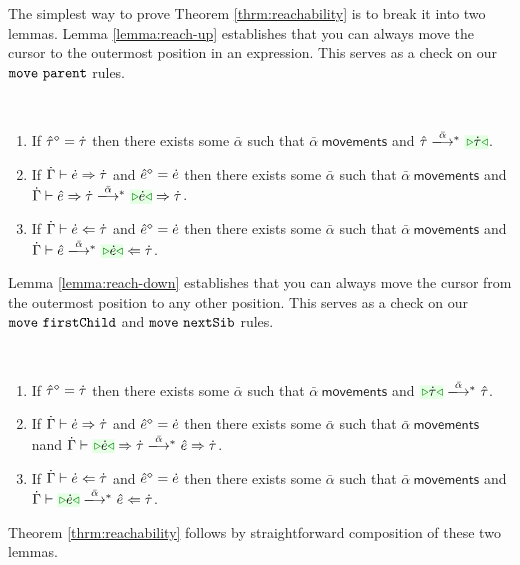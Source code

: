 The simplest way to prove Theorem \ref{thrm:reachability} is to break it
into two lemmas. Lemma \ref{lemma:reach-up} establishes that you can always
move the cursor to the outermost position in an expression. This serves as
a check on our $\mathtt{move}~\mathtt{parent}$ rules.
\begin{lemma}[Reach Up]\label{lemma:reach-up} ~
  \begin{enumerate}[itemsep=0px,partopsep=0px,topsep=0px]
  \item If $\hat{\tau}^{\diamond}=\dot{\tau}$ then there exists some $\bar\alpha$
    such that $\bar\alpha~\mathsf{movements}$ and
    $\performTypI{\ztau}{\bar\alpha}{\zwsel{\htau}}$.

  \item If $\dot{\Gamma} \vdash \dot{e} \Rightarrow \dot{\tau}$ and $\hat{e}^{\diamond}=\dot{e}$
    then there exists some $\bar\alpha$ such that
    $\bar\alpha~\mathsf{movements}$ and
    $\performSynI{\hGamma}{\zexp}{\htau}{\bar\alpha}{\zwsel{\hexp}}{\htau}$.

  \item If $\dot{\Gamma} \vdash \dot{e} \Leftarrow \dot{\tau}$ and $\hat{e}^{\diamond}=\dot{e}$
    then there exists some $\bar\alpha$ such that
    $\bar\alpha~\mathsf{movements}$ and
    $\performAnaI{\hGamma}{\zexp}{\htau}{\bar\alpha}{\zwsel{\hexp}}$.
  \end{enumerate}
\end{lemma}
Lemma \ref{lemma:reach-down} establishes that you can always move the
cursor from the outermost position to any other position. This serves as a
check on our $\mathtt{move}~\mathtt{firstChild}$ and $\mathtt{move}~\mathtt{nextSib}$ rules.
\begin{lemma}\label{lemma:reach-down} ~
  \begin{enumerate}[itemsep=0px,partopsep=0px,topsep=0px]
  \item If $\hat{\tau}^{\diamond}=\dot{\tau}$ then there exists some $\bar\alpha$
    such that $\bar\alpha~\mathsf{movements}$ and
    $\performTypI{\zwsel{\htau}}{\bar\alpha}{\ztau}$.

  \item If $\dot{\Gamma} \vdash \dot{e} \Rightarrow \dot{\tau}$ and $\hat{e}^{\diamond}=\dot{e}$
    then there exists some $\bar\alpha$ such that
    $\bar\alpha~\mathsf{movements}$ nand
    $\performSynI{\hGamma}{\zwsel{\hexp}}{\htau}{\bar\alpha}{\zexp}{\htau}$.

  \item If $\dot{\Gamma} \vdash \dot{e} \Leftarrow \dot{\tau}$ and $\hat{e}^{\diamond}=\dot{e}$
    then there exists some $\bar\alpha$ such that
    $\bar\alpha~\mathsf{movements}$ and
    $\performAnaI{\hGamma}{\zwsel{\hexp}}{\htau}{\bar\alpha}{\zexp}$.
  \end{enumerate}
\end{lemma}
Theorem \ref{thrm:reachability} follows by straightforward composition of
these two lemmas.

